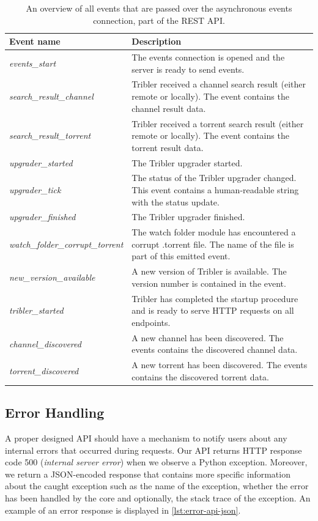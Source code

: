 \begin{table}
	\begin{tabularx}{\textwidth}{|l|X|}
		\hline
		\textbf{Event name} & \textbf{Description} \\ \hline
		\emph{events\_start} & The events connection is opened and the server is ready to send events.  \\ \hline
		\emph{search\_result\_channel} & Tribler received a channel search result (either remote or locally). The event contains the channel result data. \\ \hline
		\emph{search\_result\_torrent} & Tribler received a torrent search result (either remote or locally). The event contains the torrent result data. \\ \hline
		\emph{upgrader\_started} & The Tribler upgrader started. \\ \hline
		\emph{upgrader\_tick} & The status of the Tribler upgrader changed. This event contains a human-readable string with the status update. \\ \hline
		\emph{upgrader\_finished} & The Tribler upgrader finished. \\ \hline
		\emph{watch\_folder\_corrupt\_torrent} & The watch folder module has encountered a corrupt .torrent file. The name of the file is part of this emitted event.\\ \hline
		\emph{new\_version\_available} & A new version of Tribler is available. The version number is contained in the event.\\ \hline
		\emph{tribler\_started} & Tribler has completed the startup procedure and is ready to serve HTTP requests on all endpoints.\\ \hline
		\emph{channel\_discovered} & A new channel has been discovered. The events contains the discovered channel data.\\ \hline
		\emph{torrent\_discovered} & A new torrent has been discovered. The events contains the discovered torrent data.\\ \hline
	\end{tabularx}
	\caption{An overview of all events that are passed over the asynchronous events connection, part of the REST API.}
	\label{table:rest-api-events}
\end{table}

\subsection{Error Handling}
A proper designed API should have a mechanism to notify users about any internal errors that occurred during requests. Our API returns HTTP response code 500 (\emph{internal server error}) when we observe a Python exception. Moreover, we return a JSON-encoded response that contains more specific  information about the caught exception such as the name of the exception, whether the error has been handled by the core and optionally, the stack trace of the exception. An example of an error response is displayed in \ref{lst:error-api-json}.

